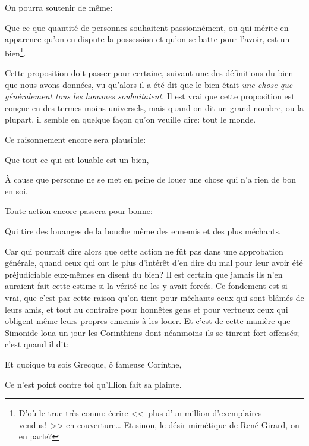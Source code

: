 \bigbreak

On pourra soutenir de même:

\begin{emphpar}
	   Que ce que quantité de personnes souhaitent passionnément, ou qui mérite en apparence qu'on en dispute la
	   possession et qu'on se batte pour l'avoir, est un bien\footnote{D'où le truc très connu: écrire <<~plus d'un
	   million d'exemplaires vendus!~>> en couverture\dots{} Et sinon, le désir mimétique de René Girard, on en
	   parle?}.
\end{emphpar}

Cette proposition doit passer pour certaine, suivant une des définitions du bien que nous avons données, vu qu'alors
il a été dit que le bien était \emph{une chose que généralement tous les hommes souhaitaient}. Il est vrai que cette
proposition est conçue en des termes moins universels, mais quand on dit un grand nombre, ou la plupart, il semble en
quelque façon qu'on veuille dire: tout le monde.

\bigbreak

Ce raisonnement encore sera plausible:

\begin{emphpar}
	   Que tout ce qui est louable est un bien,
\end{emphpar}

À cause que personne ne se met en peine de louer une chose qui n'a rien de bon en soi. 

\bigbreak

Toute action encore passera pour bonne:

\begin{emphpar}
	   Qui tire des louanges de la bouche même des ennemis et des plus méchants.
\end{emphpar}

Car qui pourrait dire alors que cette action ne fût pas dans une approbation générale, quand ceux qui ont le plus d'intérêt
d'en dire du mal pour leur avoir été préjudiciable eux-mêmes en disent du bien? Il est certain que jamais ils n'en auraient
fait cette estime si la vérité ne les y avait forcés. Ce fondement est si vrai, que c'est par cette raison qu'on tient pour
méchants ceux qui sont blâmés de leurs amis, et tout au contraire pour honnêtes gens et pour vertueux ceux qui obligent même
leurs propres ennemis à les louer. Et c'est de cette manière que Simonide loua un jour les Corinthiens dont néanmoins ils se
tinrent fort offensés; c'est quand il dit:

\begin{emphpar}
	   Et quoique tu sois Grecque, ô fameuse Corinthe,
	   
	   Ce n'est point contre toi qu'Illion fait sa plainte.
\end{emphpar}

